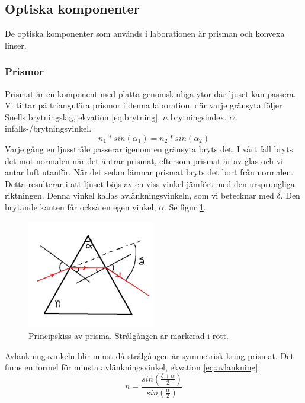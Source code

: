 \documentclass[a4paper]{article}
\begin{document}
\subsection{Optiska komponenter}
De optiska komponenter som används i laborationen är prisman och konvexa linser.
\subsubsection{Prismor}
Prismat är en komponent med platta genomskinliga ytor där ljuset kan passera. Vi tittar på triangulära prismor i denna laboration,
där varje gränsyta följer Snells brytningslag, ekvation \ref{eq:brytning}. $n$ brytningsindex. $\alpha$ infalls-/brytningsvinkel.
\begin{equation}
    n_1*sin(\alpha_1) = n_2*sin(\alpha_2)
    \label{eq:brytning}
\end{equation}
Varje gång en ljusstråle passerar igenom en gränsyta bryts det. I vårt fall bryts det mot normalen när det äntrar prismat, eftersom prismat är av glas och vi antar luft utanför.
När det sedan lämnar prismat bryts det bort från normalen. Detta resulterar i att ljuset böjs av en viss vinkel jämfört med den ursprungliga riktningen. Denna vinkel kallas
avlänkningsvinkeln, som vi betecknar med $\delta$. Den brytande kanten får också en egen vinkel, $\alpha$. Se figur \ref{fig:prism}.
\begin{figure}[h!]
    \centering
    \includegraphics[width=0.5\textwidth]{prism.png}
    \caption{Principskiss av prisma. Strålgången är markerad i rött.}
    \label{fig:prism}
\end{figure}
Avlänkningsvinkeln blir minst då strålgången är symmetrisk kring prismat. Det finns en formel för minsta avlänkningsvinkel, ekvation \ref{eq:avlankning}.
\begin{equation}
    n = \frac{sin(\frac{\delta +\alpha}{2})}{sin(\frac{\alpha}{2})}
    \label{eq:avlankning}
\end{equation}
\end{document}
